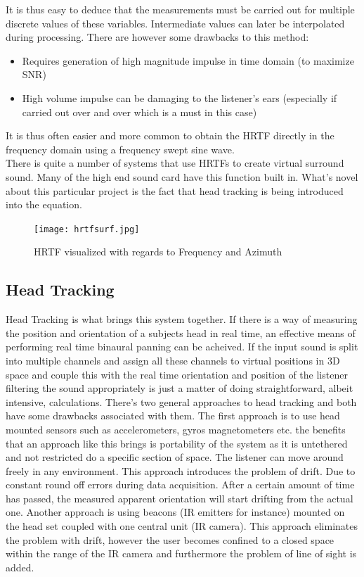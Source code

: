 \documentclass[a4paper,12pt,oneside]{article}
\begin{document}
It is thus easy to deduce that the measurements must be carried out for multiple discrete values of these variables. Intermediate values can later be interpolated during processing. There are however some drawbacks to this method: 
\begin{itemize}
\item Requires generation of high magnitude impulse in time domain (to maximize SNR)
\item High volume impulse can be damaging to the listener's ears (especially if carried out over and over which is a must in this case)
\end{itemize}
It is thus often easier and more common to obtain the HRTF directly in the frequency domain using a frequency swept sine wave.\\
There is quite a number of systems that use HRTFs to create virtual surround sound. Many of the high end sound card have this function built in. What's novel about this particular project is the fact that head tracking is being introduced into the equation.\cite{iid1}

\begin{center}
\begin{figure}[H]
    \centering
\texttt{[image: hrtfsurf.jpg]}    \caption{HRTF visualized with regards to Frequency and Azimuth}
    \label{fig:hrtf}
\end{figure}

\end{center}  
  
\subsection{Head Tracking}

Head Tracking is what brings this system together. If there is a way of measuring the position and orientation of a subjects head in real time, an effective means of performing real time binaural panning can be acheived. If the input sound is split into multiple channels and assign all these channels to virtual positions in 3D space and couple this with the real time orientation and position of the listener filtering the sound appropriately is just a matter of doing straightforward, albeit intensive, calculations.
There's two general approaches to head tracking and both have some drawbacks associated with them. The first approach is to use head mounted sensors such as accelerometers, gyros magnetometers etc. the benefits that an approach like this brings is portability of the system as it is untethered and not restricted do a specific section of space. The listener can move around freely in any environment. This approach introduces the problem of drift. Due to constant round off errors during data acquisition. After a certain amount of time has passed, the measured apparent orientation will start drifting from the actual one.
Another approach is using beacons (IR emitters for instance) mounted on the head set coupled with one central unit (IR camera). This approach eliminates the problem with drift, however the user becomes confined to a closed space within the range of the IR camera and furthermore the problem of line of sight is added.\cite{rob1}\\ 
  
\end{document}
